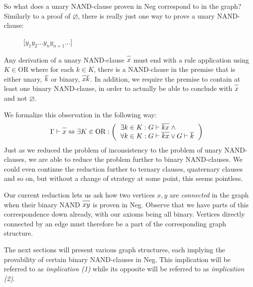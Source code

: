 So what does a unary NAND-clause proven in Neg correspond to in the graph?
Similarly to a proof of $\varnothing$, there is really just one way to prove a unary NAND-clause:\par
\begin{figure}[!h]
  \centering
  \begin{prooftree*}
    \Hypo{\dots}
    \Hypo{\dots}
    [$y_1y_2\dots y_ny_{n+1}\dots$]{}
  \end{prooftree*}
  \caption{}
  \label{fig:proof_unary_nand}
\end{figure}
Any derivation of a unary NAND-clause $\ol{x}$ must end with a rule application using $K \in \text{OR}$ where for each $k \in K$, there is a NAND-clause in the premise that is either unary, $\ol{k}$ or binary, $\ol{xk}$.
In addition, we require the premise to contain at least one binary NAND-clause, in order to actually be able to conclude with $\ol x$ and not $\varnothing$.

We formalize this observation in the following way:
\begin{align}
  \Gamma \vdash \ol{x} \Leftrightarrow \exists K \in \text{OR}:
  \left ( \begin{tabular}{l}
  $\exists k \in K: G \vdash \ol{kx} \; \wedge$\\
  $\forall k \in K: G \vdash \ol{kx} \vee G \vdash \ol{k}$
  \end{tabular} \right )
\end{align}
Just as we reduced the problem of inconsistency to the problem of unary NAND-clauses, we are able to reduce the problem further to binary NAND-clauses.
We could even continue the reduction further to ternary clauses, quaternary clauses and so on, but without a change of strategy at some point, this seems pointless.

Our current reduction lets us ask how two vertices $x,y$ are \textit{connected} in the graph when their binary NAND $\ol{xy}$ is proven in Neg.
Observe that we have parts of this correspondence down already, with our axioms being all binary.
Vertices directly connected by an edge must therefore be a part of the corresponding graph structure.


The next sections will present various graph structures, each implying the provability of certain binary NAND-clauses in Neg.
This implication will be referred to as \textit{implication (1)} while its opposite will be referred to as \textit{implication (2)}.

